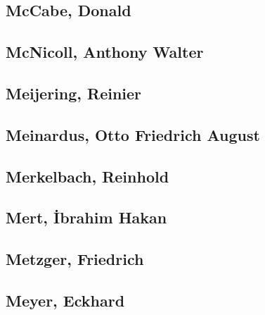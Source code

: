 \subsection[McCabe, Donald (1)]{McCabe, Donald}

\subsection[McNicoll, Anthony Walter (1)]{McNicoll, Anthony Walter}

\subsection[Meijering, Reinier (1)]{Meijering, Reinier}

\subsection[Meinardus, Otto Friedrich August (1)]{Meinardus, Otto Friedrich August}

\subsection[Merkelbach, Reinhold (3)]{Merkelbach, Reinhold}



\subsection[Mert, İbrahim Hakan (1)]{Mert, İbrahim Hakan}

\subsection[Metzger, Friedrich (1)]{Metzger, Friedrich}

\subsection[Meyer, Eckhard (1)]{Meyer, Eckhard}

